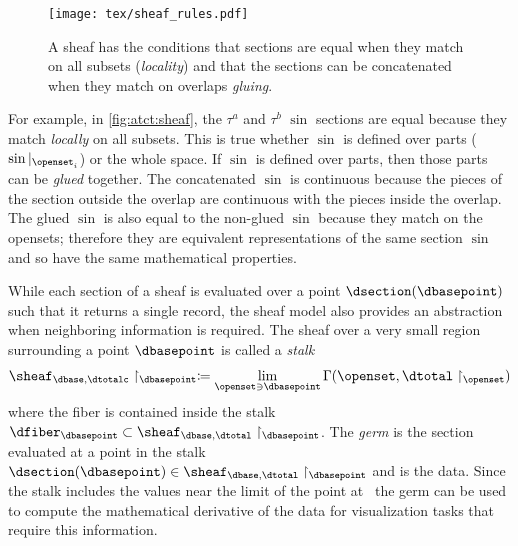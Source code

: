 \documentclass[review]{vgtc}
\theoremstyle{definition}
\theoremstyle{remark}
\begin{document}
\begin{figure}[h]
  \texttt{[image: tex/sheaf\_rules.pdf]}
  \caption{A sheaf has the conditions that sections are equal when they match on all subsets (\textit{locality}) and that the sections can be concatenated when they match on overlaps \textit{gluing}.\label{fig:atct:sheaf}}
\end{figure}

For example, in \autoref{fig:atct:sheaf}, the $\tau^{a}$ and $\tau^{b}$ $\sin$ sections are equal because they match \textit{locally} on all subsets. This is true whether $\sin$ is defined over parts ($\sin\vert_{\openset_i}$) or the whole space. If $\sin$ is defined over parts, then those parts can be \textit{glued} together. The concatenated $\sin$ is continuous because the pieces of the section outside the overlap are continuous with the pieces inside the overlap. The glued $\sin$ is also equal to the non-glued $\sin$ because they match on the opensets; therefore they are equivalent representations of the same section $\sin$ and so have the same mathematical properties.

While each section of a sheaf is evaluated over a point $\dsection(\dbasepoint)$ such that it returns a single record, the sheaf model also provides an abstraction when neighboring information is required. The sheaf over a very small region surrounding a point $\dbasepoint$ is called a \textit{stalk}\cite{harder2008lectures}
\begin{equation}
  \label{eq:atct:sheaf:stalk}
    \sheaf_{\dbase, \dtotalc}\restriction_{\dbasepoint}\coloneqq \lim\limits_{\openset\ni \dbasepoint} \Gamma(\openset, \dtotal\restriction_{\openset})
\end{equation}
where the fiber is contained inside the stalk  $\dfiber_{\dbasepoint} \subset  \sheaf_{\dbase, \dtotal}\restriction_{\dbasepoint}$. The \textit{germ} is the section evaluated at a point in the stalk  $\dsection(\dbasepoint) \in \sheaf_{\dbase, \dtotal}\restriction_{\dbasepoint}$ and is the data. Since the stalk includes the values near the limit of the point at \dbasepoint\, the germ can be used to compute the mathematical derivative of the data for visualization tasks that require this information.
\end{document}

